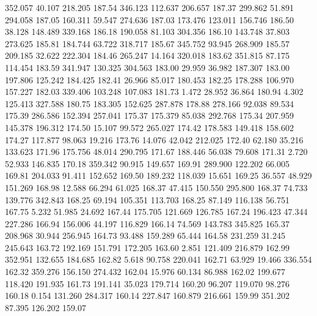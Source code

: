  352.057   40.107  218.205       187.54
 346.123  112.637  206.657       187.37
 299.862   51.891  294.058       187.05
 160.311   59.547  274.636       187.03
 173.476  123.011  156.746       186.50
  38.128  148.489  339.168       186.18
 190.058   81.103  304.356       186.10
 143.748   37.803  273.625       185.81
 184.744   63.722  318.717       185.67
 345.752   93.945  268.909       185.57
 209.185   32.622  222.304       184.46
 265.247   14.164  320.018       183.62
 351.815   87.175  114.454       183.59
 341.947  130.325  304.563       183.00
  29.959   36.982  187.307       183.00
 197.806  125.242  184.425       182.41
  26.966   85.017  180.453       182.25
 178.288  106.970  157.227       182.03
 339.406  103.248  107.083       181.73
   1.472   28.952   36.864       180.94
   4.302  125.413  327.588       180.75
 183.305  152.625  287.878       178.88
 278.166   92.038   89.534       175.39
 286.586  152.394  257.041       175.37
 175.379   85.038  292.768       175.34
 207.959  145.378  196.312       174.50
  15.107   99.572  265.027       174.42
 178.583  149.418  158.602       174.27
 117.877   98.063   19.216       173.76
  14.076   42.042  212.025       172.40
  62.180   35.216  133.623       171.96
 175.756   48.014  290.795       171.67
 188.446   56.038   79.608       171.31
   2.720   52.933  146.835       170.18
 359.342   90.915  149.657       169.91
 289.900  122.202   66.005       169.81
 204.033   91.411  152.652       169.50
 189.232  118.039   15.651       169.25
  36.557   48.929  151.269       168.98
  12.588   66.294   61.025       168.37
  47.415  150.550  295.800       168.37
  74.733  139.776  342.843       168.25
  69.194  105.351  113.703       168.25
  87.149  116.138   56.751       167.75
   5.232   51.985   24.692       167.44
 175.705  121.669  126.785       167.24
 196.423   47.344  227.286       166.94
 156.006   44.197  116.829       166.14
  74.569  143.783  345.825       165.37
 208.968   30.944  256.945       164.73
  93.488  159.289   65.444       164.58
 231.259   31.245  245.643       163.72
 192.169  151.791  172.205       163.60
   2.851  121.409  216.879       162.99
 352.951  132.655  184.685       162.82
   5.618   90.758  220.041       162.71
  63.929   19.466  336.554       162.32
 359.276  156.150  274.432       162.04
  15.976   60.134   86.988       162.02
 199.677  118.420  191.935       161.73
 191.141   35.023  179.714       160.20
  96.207  119.070   98.276       160.18
   0.154  131.260  284.317       160.14
 227.847  160.879  216.661       159.99
 351.202   87.395  126.202       159.07
